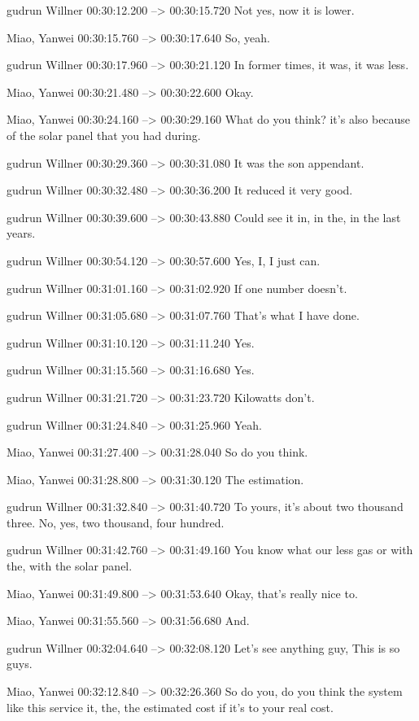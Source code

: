 {gudrun Willner 00:30:12.200 --> 00:30:15.720
Not yes, now it is lower.

Miao, Yanwei 00:30:15.760 --> 00:30:17.640
So, yeah.

gudrun Willner 00:30:17.960 --> 00:30:21.120
In former times, it was, it was less.

Miao, Yanwei 00:30:21.480 --> 00:30:22.600
Okay.

Miao, Yanwei 00:30:24.160 --> 00:30:29.160
What do you think? it's also because of the solar panel that you had during.

gudrun Willner 00:30:29.360 --> 00:30:31.080
It was the son appendant.

gudrun Willner 00:30:32.480 --> 00:30:36.200
It reduced it very good.

gudrun Willner 00:30:39.600 --> 00:30:43.880
Could see it in, in the, in the last years.

gudrun Willner 00:30:54.120 --> 00:30:57.600
Yes, I, I just can.

gudrun Willner 00:31:01.160 --> 00:31:02.920
If one number doesn't.

gudrun Willner 00:31:05.680 --> 00:31:07.760
That's what I have done.

gudrun Willner 00:31:10.120 --> 00:31:11.240
Yes.

gudrun Willner 00:31:15.560 --> 00:31:16.680
Yes.

gudrun Willner 00:31:21.720 --> 00:31:23.720
Kilowatts don't.

gudrun Willner 00:31:24.840 --> 00:31:25.960
Yeah.

Miao, Yanwei 00:31:27.400 --> 00:31:28.040
So do you think.

Miao, Yanwei 00:31:28.800 --> 00:31:30.120
The estimation.

gudrun Willner 00:31:32.840 --> 00:31:40.720
To yours, it's about two thousand three. No, yes, two thousand, four hundred.

gudrun Willner 00:31:42.760 --> 00:31:49.160
You know what our less gas or with the, with the solar panel.

Miao, Yanwei 00:31:49.800 --> 00:31:53.640
Okay, that's really nice to.

Miao, Yanwei 00:31:55.560 --> 00:31:56.680
And.

gudrun Willner 00:32:04.640 --> 00:32:08.120
Let's see anything guy, This is so guys.

Miao, Yanwei 00:32:12.840 --> 00:32:26.360
So do you, do you think the system like this service it, the, the estimated cost if it's to your real cost.

}
